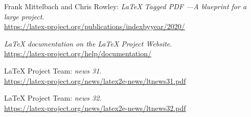 \documentclass{ltnews}
\providecommand\Dash {\unskip ---}
\begin{document}
\begin{thebibliography}{9}

\fontsize{9.3}{11.3}\selectfont

 Frank Mittelbach and Chris Rowley:
  \emph{\LaTeX{} Tagged PDF \Dash A blueprint for a large project}.\\
  \url{https://latex-project.org/publications/indexbyyear/2020/}

  \emph{\LaTeX{} documentation on the \LaTeX{} Project Website}.\\
  \url{https://latex-project.org/help/documentation/}

 \LaTeX{} Project Team:
  \emph{\LaTeXe{} news 31}.\\
  \url{https://latex-project.org/news/latex2e-news/ltnews31.pdf}

 \LaTeX{} Project Team:
  \emph{\LaTeXe{} news 32}.\\
  \url{https://latex-project.org/news/latex2e-news/ltnews32.pdf}

\end{thebibliography}
\end{document}
